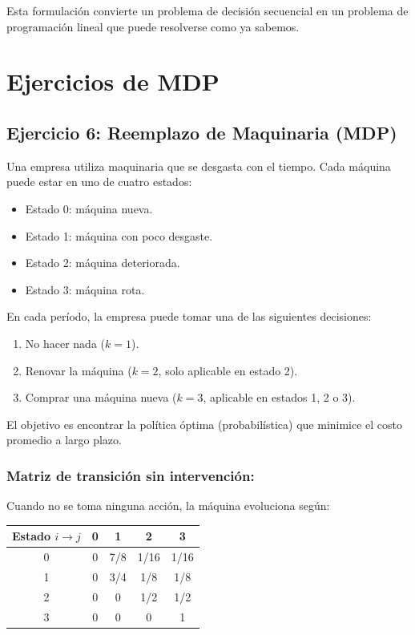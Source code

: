 \documentclass[a4paper,11pt]{article}
\begin{document}
Esta formulación convierte un problema de decisión secuencial en un problema de programación lineal que puede resolverse como ya sabemos.

\section{Ejercicios de MDP}

\subsection{Ejercicio 6: Reemplazo de Maquinaria (MDP)}

Una empresa utiliza maquinaria que se desgasta con el tiempo. Cada máquina puede estar en uno de cuatro estados:

\begin{itemize}
    \item Estado 0: máquina nueva.
    \item Estado 1: máquina con poco desgaste.
    \item Estado 2: máquina deteriorada.
    \item Estado 3: máquina rota.
\end{itemize}

En cada período, la empresa puede tomar una de las siguientes decisiones:

\begin{enumerate}
    \item No hacer nada ($k=1$).
    \item Renovar la máquina ($k=2$, solo aplicable en estado 2).
    \item Comprar una máquina nueva ($k=3$, aplicable en estados 1, 2 o 3).
\end{enumerate}

El objetivo es encontrar la política óptima (probabilística) que minimice el costo promedio a largo plazo.

\subsubsection*{Matriz de transición sin intervención:}

Cuando no se toma ninguna acción, la máquina evoluciona según:

\begin{center}
\begin{tabular}{c|cccc}
\toprule
Estado $i \to j$ & 0 & 1 & 2 & 3 \\
\midrule
0 & 0 & 7/8 & 1/16 & 1/16 \\
1 & 0 & 3/4 & 1/8 & 1/8 \\
2 & 0 & 0 & 1/2 & 1/2 \\
3 & 0 & 0 & 0 & 1 \\
\bottomrule
\end{tabular}
\end{center}
\end{document}
